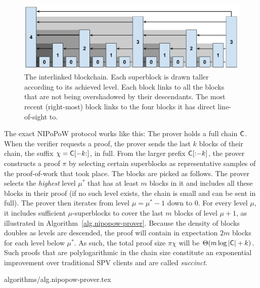 \begin{figure}[ht]
    \centering
    \includegraphics[width=0.8\columnwidth,keepaspectratio]{figures/level-shadows.pdf}
    \caption{The interlinked blockchain. Each superblock is drawn taller
    according to its achieved level. Each block links to all the blocks that are
    not being overshadowed by their descendants. The most recent (right-most)
    block links to the four blocks it has direct line-of-sight to.}
    \label{fig.hierarchy}
\end{figure}

The exact NIPoPoW protocol works like this: The prover holds a full chain
$\mathsf{C}$. When the verifier requests a proof, the prover sends the last $k$
blocks of their chain, the suffix $\chi = \mathsf{C}[-k{:}]$, in full. From the
larger prefix $\mathsf{C}[{:}{-k}]$, the prover constructs a proof $\pi$ by selecting
certain superblocks as representative samples of the proof-of-work that took
place. The blocks are picked as follows. The prover selects the \emph{highest}
level $\mu^*$ that has at least $m$ blocks in it and includes all these blocks
in their proof (if no such level exists, the chain is small and can be sent in
full). The prover then iterates from level $\mu = \mu^* - 1$ down to $0$. For
every level $\mu$, it includes sufficient $\mu$-superblocks to cover the last
$m$ blocks of level $\mu + 1$, as illustrated in
Algorithm~\ref{alg.nipopow-prover}. Because the density of blocks doubles as
levels are descended, the proof will contain in expectation $2m$ blocks for each
level below $\mu^*$. As such, the total proof size $\pi \chi$ will be
$\Theta(m\log|\mathsf{C}| + k)$. Such proofs that are polylogarithmic in the chain
size constitute an exponential improvement over traditional SPV clients and are
called \emph{succinct}.

{algorithms/alg.nipopow-prover.tex}

